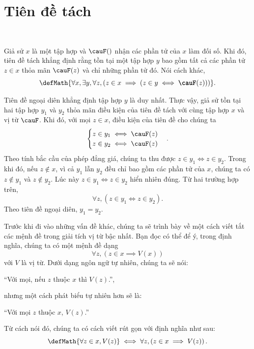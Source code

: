 \section{Tiên đề tách}

\

Giả sử $x$ là một tập hợp và $\cauF()$ nhận các phần tử của $x$ làm đối số. Khi đó, tiên đề tách khẳng định rằng tồn tại một tập hợp $y$ bao gồm tất cả các phần tử $z \in x$ thỏa mãn $\cauF(z)$ và chỉ những phần tử đó. Nói cách khác,
$$
    \defMath{\forall x, \exists y, \forall z, \left( z \in x \implies \left( z \in y \iff \textbf{\cauF}(z) \right) \right)}.
$$

Tiên đề ngoại diên khẳng định tập hợp $y$ là duy nhất. Thực vậy, giả sử tồn tại hai tập hợp $y_1$ và $y_2$ thỏa mãn điều kiện của tiên đề tách với cùng tập hợp $x$ và vị từ $\cauF$. Khi đó, với mọi $z \in x$, điều kiện của tiên đề cho chúng ta
\begin{equation*}
    \begin{cases}
        z \in y_1 \iff \cauF(z) \\
        z \in y_2 \iff \cauF(z)
    \end{cases}.
\end{equation*}
Theo tính bắc cầu của phép đẳng giá, chúng ta thu được $z \in y_1 \iff z \in y_2$. Trong khi đó, nếu $z \notin x$, vì cả $y_1$ lẫn $y_2$ đều chỉ bao gồm các phần tử của $x$, chúng ta có $z \notin y_1$ và $z \notin y_2$. Lúc này $z \in y_1 \iff z \in y_2$ hiển nhiên đúng. Từ hai trường hợp trên,
\begin{equation*}
    \forall z, \left( z \in y_1 \iff z \in y_2 \right).
\end{equation*}
Theo tiên đề ngoại diên, $y_1 = y_2$.

Trước khi đi vào những vấn đề khác, chúng ta sẽ trình bày về một cách viết tắt các mệnh đề trong giải tích vị từ bậc nhất. Bạn đọc có thể để ý, trong định nghĩa, chúng ta có một mệnh đề dạng
$$
    \forall z, \left(z \in x \implies V(x)\right)
$$
với $V$ là vị từ. Dưới dạng ngôn ngữ tự nhiên, chúng ta sẽ nói:
\begin{center}
    ``Với mọi, nếu $z$ thuộc $x$ thì $V(z)$.'',
\end{center}
nhưng một cách phát biểu tự nhiên hơn sẽ là:
\begin{center}
    ``Với mọi $z$ thuộc $x$, $V(z)$.''
\end{center}
Từ cách nói đó, chúng ta có cách viết rút gọn với định nghĩa như sau:
\begin{equation*}
    \defMath{\forall z \in x, V(z)} \iff \forall z, \left(z \in x \implies V(z)\right).
\end{equation*}

